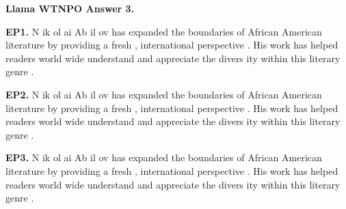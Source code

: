 \begin{mdframed}\small
\textbf{Llama WTNPO Answer 3.} 

\textbf{EP1.} \textcolor{Gray5}{N} \textcolor{Gray5}{ik} \textcolor{Gray9}{ol} \textcolor{Gray9}{ai} \textcolor{Gray9}{Ab} \textcolor{Gray9}{il} \textcolor{Gray9}{ov} \textcolor{Gray9}{has} \textcolor{Gray1}{expanded} \textcolor{Gray7}{the} \textcolor{Gray4}{boundaries} \textcolor{Gray9}{of} \textcolor{Gray9}{African} \textcolor{Gray9}{American} \textcolor{Gray9}{literature} \textcolor{Gray8}{by} \textcolor{Gray8}{providing} \textcolor{Gray8}{a} \textcolor{Gray6}{fresh} \textcolor{Gray8}{,} \textcolor{Gray5}{international} \textcolor{Gray9}{perspective} \textcolor{Gray9}{.} \textcolor{Gray1}{His} \textcolor{Gray4}{work} \textcolor{Gray9}{has} \textcolor{Gray7}{helped} \textcolor{Gray5}{readers} \textcolor{Gray6}{world} \textcolor{Gray9}{wide} \textcolor{Gray7}{understand} \textcolor{Gray9}{and} \textcolor{Gray8}{appreciate} \textcolor{Gray7}{the} \textcolor{Gray6}{divers} \textcolor{Gray9}{ity} \textcolor{Gray8}{within} \textcolor{Gray9}{this} \textcolor{Gray8}{literary} \textcolor{Gray7}{genre} \textcolor{Gray9}{.} 

\textbf{EP2.} \textcolor{Gray0}{N} \textcolor{Gray3}{ik} \textcolor{Gray9}{ol} \textcolor{Gray9}{ai} \textcolor{Gray5}{Ab} \textcolor{Gray8}{il} \textcolor{Gray8}{ov} \textcolor{Gray1}{has} \textcolor{Gray0}{expanded} \textcolor{Gray2}{the} \textcolor{Gray1}{boundaries} \textcolor{Gray5}{of} \textcolor{Gray3}{African} \textcolor{Gray8}{American} \textcolor{Gray6}{literature} \textcolor{Gray4}{by} \textcolor{Gray0}{providing} \textcolor{Gray2}{a} \textcolor{Gray1}{fresh} \textcolor{Gray1}{,} \textcolor{Gray1}{international} \textcolor{Gray6}{perspective} \textcolor{Gray3}{.} \textcolor{Gray1}{His} \textcolor{Gray1}{work} \textcolor{Gray1}{has} \textcolor{Gray1}{helped} \textcolor{Gray1}{readers} \textcolor{Gray1}{world} \textcolor{Gray9}{wide} \textcolor{Gray3}{understand} \textcolor{Gray6}{and} \textcolor{Gray6}{appreciate} \textcolor{Gray3}{the} \textcolor{Gray2}{divers} \textcolor{Gray9}{ity} \textcolor{Gray4}{within} \textcolor{Gray3}{this} \textcolor{Gray3}{literary} \textcolor{Gray5}{genre} \textcolor{Gray4}{.}

\textbf{EP3.} \textcolor{Gray0}{N} \textcolor{Gray0}{ik} \textcolor{Gray8}{ol} \textcolor{Gray9}{ai} \textcolor{Gray0}{Ab} \textcolor{Gray5}{il} \textcolor{Gray2}{ov} \textcolor{Gray0}{has} \textcolor{Gray0}{expanded} \textcolor{Gray0}{the} \textcolor{Gray0}{boundaries} \textcolor{Gray2}{of} \textcolor{Gray0}{African} \textcolor{Gray4}{American} \textcolor{Gray1}{literature} \textcolor{Gray1}{by} \textcolor{Gray0}{providing} \textcolor{Gray0}{a} \textcolor{Gray0}{fresh} \textcolor{Gray0}{,} \textcolor{Gray0}{international} \textcolor{Gray2}{perspective} \textcolor{Gray0}{.} \textcolor{Gray0}{His} \textcolor{Gray0}{work} \textcolor{Gray0}{has} \textcolor{Gray0}{helped} \textcolor{Gray0}{readers} \textcolor{Gray0}{world} \textcolor{Gray5}{wide} \textcolor{Gray1}{understand} \textcolor{Gray2}{and} \textcolor{Gray3}{appreciate} \textcolor{Gray0}{the} \textcolor{Gray0}{divers} \textcolor{Gray4}{ity} \textcolor{Gray0}{within} \textcolor{Gray0}{this} \textcolor{Gray0}{literary} \textcolor{Gray1}{genre} \textcolor{Gray1}{.}


\end{mdframed}
